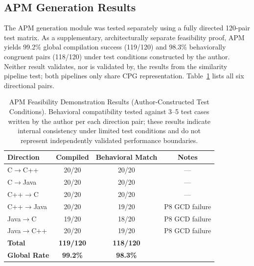 \subsection{APM Generation Results}
\label{subsec:apm_results}

The APM generation module was tested separately using a fully directed 120-pair test matrix. As a supplementary, architecturally separate feasibility proof, APM yields 99.2\% global compilation success (119/120) and 98.3\% behaviorally congruent pairs (118/120) under test conditions constructed by the author. Neither result validates, nor is validated by, the results from the similarity pipeline test; both pipelines only share CPG representation. Table~\ref{tab:apm_results} lists all six directional pairs.

\begin{table}[ht]
\caption{APM Feasibility Demonstration Results (Author-Constructed Test Conditions). Behavioral compatibility tested against 3--5 test cases written by the author per each direction pair; these results indicate internal consistency under limited test conditions and do not represent independently validated performance boundaries.}
\label{tab:apm_results}
\centering
\begin{tabular}{|l|c|c|c|}
\hline
\textbf{Direction} & \textbf{Compiled} & \textbf{Behavioral Match} & \textbf{Notes} \\
\hline
C$\rightarrow$C++     & 20/20 & 20/20 & --- \\
C$\rightarrow$Java    & 20/20 & 20/20 & --- \\
C++$\rightarrow$C     & 20/20 & 20/20 & --- \\
C++$\rightarrow$Java  & 20/20 & 19/20 & P8 GCD failure \\
Java$\rightarrow$C    & 19/20 & 18/20 & P8 GCD failure \\
Java$\rightarrow$C++  & 20/20 & 19/20 & P8 GCD failure \\
\hline
\textbf{Total}        & \textbf{119/120} & \textbf{118/120} & \\
\hline
\textbf{Global Rate} & \textbf{99.2\%} & \textbf{98.3\%} & \\
\hline
\end{tabular}
\end{table}

